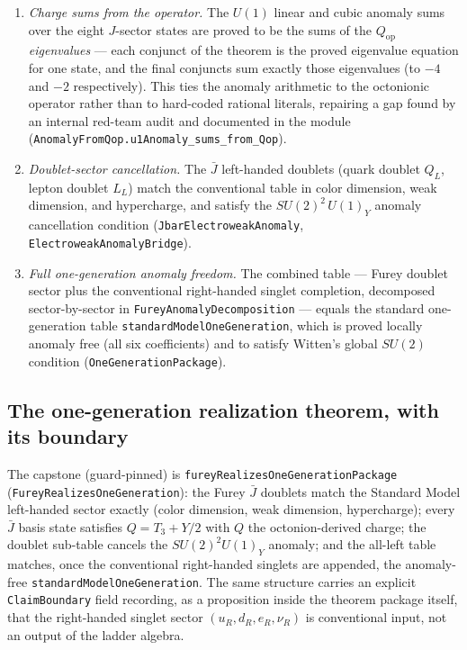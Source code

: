 \documentclass[11pt]{article}
\newcommand{\leanname}[1]{\texttt{#1}}
\begin{document}
\begin{enumerate}[leftmargin=2em]
\item \emph{Charge sums from the operator.}  The $U(1)$ linear and cubic
  anomaly sums over the eight $J$-sector states are proved to be the sums
  of the $Q_{\mathrm{op}}$ \emph{eigenvalues} --- each conjunct of the
  theorem is the proved eigenvalue equation for one state, and the final
  conjuncts sum exactly those eigenvalues (to $-4$ and $-2$
  respectively).  This ties the anomaly arithmetic to the octonionic
  operator rather than to hard-coded rational literals, repairing a gap
  found by an internal red-team audit and documented in the module
  (\leanname{AnomalyFromQop.u1Anomaly\_sums\_from\_Qop}).
\item \emph{Doublet-sector cancellation.}  The $\bar J$ left-handed
  doublets (quark doublet $Q_L$, lepton doublet $L_L$) match the
  conventional table in color dimension, weak dimension, and
  hypercharge, and satisfy the $SU(2)^2\,U(1)_Y$ anomaly cancellation
  condition (\leanname{JbarElectroweakAnomaly},
  \leanname{ElectroweakAnomalyBridge}).
\item \emph{Full one-generation anomaly freedom.}  The combined table ---
  Furey doublet sector plus the conventional right-handed singlet
  completion, decomposed sector-by-sector in
  \leanname{FureyAnomalyDecomposition} --- equals the standard
  one-generation table \leanname{standardModelOneGeneration}, which is
  proved locally anomaly free (all six coefficients) and to satisfy
  Witten's global $SU(2)$ condition
  (\leanname{OneGenerationPackage}).
\end{enumerate}

\subsection{The one-generation realization theorem, with its boundary}

The capstone (guard-pinned) is
\leanname{fureyRealizesOneGenerationPackage}
(\leanname{FureyRealizesOneGeneration}): the Furey $\bar J$ doublets
match the Standard Model left-handed sector exactly (color dimension,
weak dimension, hypercharge); every $\bar J$ basis state satisfies
$Q = T_3 + Y/2$ with $Q$ the octonion-derived charge; the doublet
sub-table cancels the $SU(2)^2 U(1)_Y$ anomaly; and the all-left table
matches, once the conventional right-handed singlets are appended, the
anomaly-free \leanname{standardModelOneGeneration}.  The same structure
carries an explicit \leanname{ClaimBoundary} field recording, as a
proposition inside the theorem package itself, that the right-handed
singlet sector $(u_R, d_R, e_R, \nu_R)$ is conventional input, not an
output of the ladder algebra.
\end{document}
